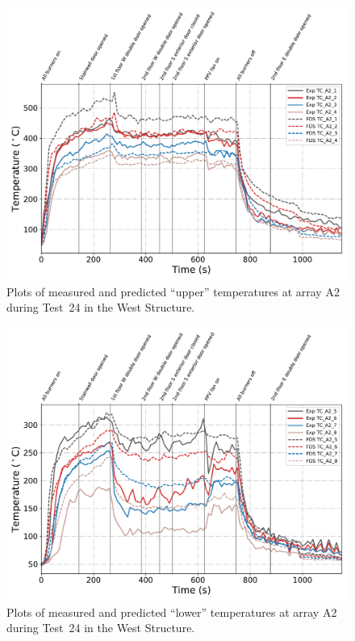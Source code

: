 \begin{figure}[!h]
	\centering
	\includegraphics[width=\columnwidth]{Figures/Plots/Validation/Temperature/Test_24_TC_A2_upper}
	\caption{Plots of measured and predicted ``upper'' temperatures at array A2 during Test~24 in the West Structure.}
	\label{fig:TCA2_upper_data_Test24}
\end{figure}
\begin{figure}[!h]
	\centering
	\includegraphics[width=\columnwidth]{Figures/Plots/Validation/Temperature/Test_24_TC_A2_lower}
	\caption{Plots of measured and predicted ``lower'' temperatures at array A2 during Test~24 in the West Structure.}
	\label{fig:TCA2_lower_data_Test24}
\end{figure}


